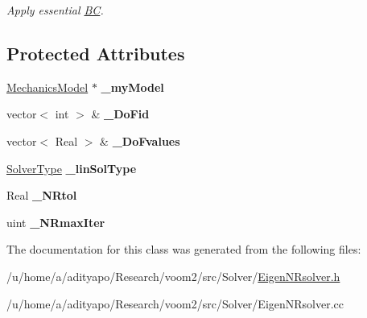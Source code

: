 \begin{DoxyCompactItemize}
\begin{DoxyCompactList}\small\item\em Apply essential \hyperlink{struct_b_c}{BC}. \item\end{DoxyCompactList}\end{DoxyCompactItemize}
\subsection*{Protected Attributes}
\begin{DoxyCompactItemize}
\item 
\hypertarget{classvoom_1_1_eigen_n_rsolver_a091b81cda6ae358080a26fa1397bb2d0}{
\hyperlink{classvoom_1_1_mechanics_model}{MechanicsModel} $\ast$ {\bfseries \_\-myModel}}
\label{classvoom_1_1_eigen_n_rsolver_a091b81cda6ae358080a26fa1397bb2d0}

\item 
\hypertarget{classvoom_1_1_eigen_n_rsolver_a158262012a884e89d858685d5f530a83}{
vector$<$ int $>$ \& {\bfseries \_\-DoFid}}
\label{classvoom_1_1_eigen_n_rsolver_a158262012a884e89d858685d5f530a83}

\item 
\hypertarget{classvoom_1_1_eigen_n_rsolver_a25b06a7cf90c5bafcebed451ab988644}{
vector$<$ Real $>$ \& {\bfseries \_\-DoFvalues}}
\label{classvoom_1_1_eigen_n_rsolver_a25b06a7cf90c5bafcebed451ab988644}

\item 
\hypertarget{classvoom_1_1_eigen_n_rsolver_ab432ebb6442be51a4c032c9fe0e8783a}{
\hyperlink{namespacevoom_a2874640a1124292b983171d745088fef}{SolverType} {\bfseries \_\-linSolType}}
\label{classvoom_1_1_eigen_n_rsolver_ab432ebb6442be51a4c032c9fe0e8783a}

\item 
\hypertarget{classvoom_1_1_eigen_n_rsolver_a9414256a12b5b5a83b2f349f8244dfcc}{
Real {\bfseries \_\-NRtol}}
\label{classvoom_1_1_eigen_n_rsolver_a9414256a12b5b5a83b2f349f8244dfcc}

\item 
\hypertarget{classvoom_1_1_eigen_n_rsolver_af225056a77b047d00460d39752b91786}{
uint {\bfseries \_\-NRmaxIter}}
\label{classvoom_1_1_eigen_n_rsolver_af225056a77b047d00460d39752b91786}

\end{DoxyCompactItemize}


The documentation for this class was generated from the following files:\begin{DoxyCompactItemize}
\item 
/u/home/a/adityapo/Research/voom2/src/Solver/\hyperlink{_eigen_n_rsolver_8h}{EigenNRsolver.h}\item 
/u/home/a/adityapo/Research/voom2/src/Solver/EigenNRsolver.cc\end{DoxyCompactItemize}
